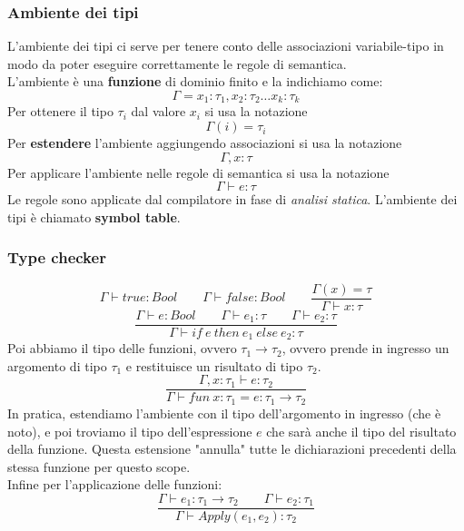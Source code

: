 \subsubsection{Ambiente dei tipi}
L'ambiente dei tipi ci serve per tenere conto delle associazioni variabile-tipo in modo da poter eseguire correttamente le regole di semantica. \\
L'ambiente è una \textbf{funzione} di dominio finito e la indichiamo come:
\begin{equation*}
	\Gamma = x_1:\tau_1,x_2:\tau_2 \ldots x_k:\tau_k
\end{equation*}
Per ottenere il tipo $\tau_i$ dal valore $x_i$ si usa la notazione
\begin{equation*}
	\Gamma(i)=\tau_i
\end{equation*}
Per \textbf{estendere} l'ambiente aggiungendo associazioni  si usa la notazione
\begin{equation*}
	\Gamma,x:\tau
\end{equation*}
Per applicare l'ambiente nelle regole di semantica si usa la notazione
\begin{equation*}
	\Gamma \vdash e:\tau
\end{equation*}
Le regole sono applicate dal compilatore in fase di \textit{analisi statica}. L'ambiente dei tipi è chiamato \textbf{symbol table}.
\newpage
\subsubsection{Type checker}
\begin{equation}
	\Gamma \vdash true:Bool \qquad \Gamma \vdash false:Bool \qquad \frac{\Gamma(x) = \tau}{\Gamma \vdash x : \tau}
\end{equation}
\begin{equation}
	\frac{\Gamma \vdash e:Bool \qquad \Gamma \vdash e_1 : \tau \qquad \Gamma \vdash e_2 : \tau}{\Gamma \vdash if \: e \: then \: e_1 \: else \: e_2 : \tau}
\end{equation}
Poi abbiamo il tipo delle funzioni, ovvero $\tau_1 \rightarrow \tau_2$, ovvero prende in ingresso un argomento di tipo $\tau_1$ e restituisce un risultato di tipo $\tau_2$.
\begin{equation}
	\frac{\Gamma,x:\tau_1 \vdash e:\tau_2}{\Gamma \vdash fun \: x:\tau_1 = e:\tau_1 \rightarrow \tau_2}
\end{equation}
In pratica, estendiamo l'ambiente con il tipo dell'argomento in ingresso (che è noto), e poi troviamo il tipo dell'espressione $e$ che sarà anche il tipo del risultato della funzione. Questa estensione "annulla" tutte le dichiarazioni precedenti della stessa funzione per questo scope.\\
Infine per l'applicazione delle funzioni:
\begin{equation}
	\frac{\Gamma \vdash e_1 : \tau_1 \rightarrow \tau_2 \qquad \Gamma \vdash e_2: \tau_1}{\Gamma \vdash Apply(e_1,e_2):\tau_2}
\end{equation}
